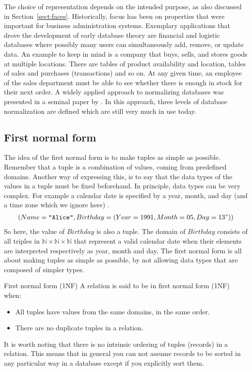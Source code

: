 The choice of representation depends on the intended purpose, as also discussed
in Section~\ref{sect:faces}. Historically, focus has been on properties that
were important for business administration systems. Exemplary applications that
drove the development of early database theory are financial and logistic
databases where possibly many users can simultaneously add, remove, or update
data.  An example to keep in mind is a company that buys, sells, and stores
goods at multiple locations.  There are tables of product availability and
location, tables of sales and purchases (transactions) and so on. At any given
time, an employee of the sales department must be able to see whether there is
enough in stock for their next order. A widely applied approach to normalizing
databases was presented in a seminal paper by \citet{codd1970relational}. In
this approach, three levels of database normalization are defined which are
still very much in use today.


\subsection{First normal form}
The idea of the first normal form is to make tuples as simple as possible.
Remember that a tuple is a combination of values, coming from predefined domains.
Another way of expressing this, is to say that the data types of the values in
a tuple must be fixed beforehand. In principle, data types can be very
complex. For example a calendar date is specified by a year, month, and day
(and a time zone which we ignore here) . 
\begin{align*}
(Name =\texttt{"Alice"}, Birthday = (Year=1991,Month=05,Day=13") )
\end{align*}
So here, the value of $Birthday$ is also a tuple. The domain of $Birthday$
consists of all triples in $\mathbb{N}\times\mathbb{N}\times\mathbb{N}$ that
represent a valid calendar date when their elements are interpreted
respectively as year, month and day.  The first normal form is all about making
tuples as simple as possible, by not allowing data types that are composed of
simpler types.
%
\begin{terminology}{First normal form (1NF)}
A relation is said to be in first normal form (1NF) when:
\begin{itemize}
  \item All tuples have values from the same domains, in the same order. 
  \item There are no duplicate tuples in a relation.
\end{itemize}
\end{terminology}
It is worth noting that there is no intrinsic ordering of tuples (records) in a
relation. This means that in general you can not assume records to be sorted in
any particular way in a database except if you explicitly sort them.

